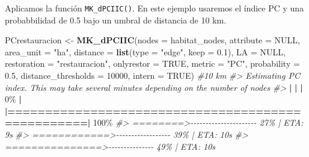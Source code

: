 \documentclass[
]{book}
\newenvironment{Shaded}{\begin{snugshade}}{\end{snugshade}}
\newcommand{\AttributeTok}[1]{\textcolor[rgb]{0.13,0.29,0.53}{#1}}
\newcommand{\CommentTok}[1]{\textcolor[rgb]{0.56,0.35,0.01}{\textit{#1}}}
\newcommand{\ConstantTok}[1]{\textcolor[rgb]{0.56,0.35,0.01}{#1}}
\newcommand{\DecValTok}[1]{\textcolor[rgb]{0.00,0.00,0.81}{#1}}
\newcommand{\ErrorTok}[1]{\textcolor[rgb]{0.64,0.00,0.00}{\textbf{#1}}}
\newcommand{\FloatTok}[1]{\textcolor[rgb]{0.00,0.00,0.81}{#1}}
\newcommand{\FunctionTok}[1]{\textcolor[rgb]{0.13,0.29,0.53}{\textbf{#1}}}
\newcommand{\NormalTok}[1]{#1}
\newcommand{\OtherTok}[1]{\textcolor[rgb]{0.56,0.35,0.01}{#1}}
\newcommand{\SpecialCharTok}[1]{\textcolor[rgb]{0.81,0.36,0.00}{\textbf{#1}}}
\newcommand{\StringTok}[1]{\textcolor[rgb]{0.31,0.60,0.02}{#1}}
\begin{document}
\begin{Shaded}
\end{Shaded}

Aplicamos la función \texttt{MK\_dPCIIC()}. En este ejemplo usaremos el índice PC y una probabbilidad de 0.5 bajo un umbral de distancia de 10 km.

\begin{Shaded}
\begin{Highlighting}[]
\NormalTok{PCrestauracion }\OtherTok{\textless{}{-}} \FunctionTok{MK\_dPCIIC}\NormalTok{(}\AttributeTok{nodes =}\NormalTok{ habitat\_nodes,}
                \AttributeTok{attribute =} \ConstantTok{NULL}\NormalTok{,}
                \AttributeTok{area\_unit =} \StringTok{"ha"}\NormalTok{,}
                \AttributeTok{distance =} \FunctionTok{list}\NormalTok{(}\AttributeTok{type =} \StringTok{"edge"}\NormalTok{, }\AttributeTok{keep =} \FloatTok{0.1}\NormalTok{),}
                \AttributeTok{LA =} \ConstantTok{NULL}\NormalTok{,}
                \AttributeTok{restoration =} \StringTok{"restauracion"}\NormalTok{,}
                \AttributeTok{onlyrestor =} \ConstantTok{TRUE}\NormalTok{,}
                \AttributeTok{metric =} \StringTok{"PC"}\NormalTok{,}
                \AttributeTok{probability =} \FloatTok{0.5}\NormalTok{,}
                \AttributeTok{distance\_thresholds =} \DecValTok{10000}\NormalTok{,}
                \AttributeTok{intern =} \ConstantTok{TRUE}\NormalTok{) }\CommentTok{\#10 km}
\CommentTok{\#\textgreater{} Estimating PC index. This may take several minutes depending on the number of nodes}
\CommentTok{\#\textgreater{} }
  \SpecialCharTok{|}                                                        
  \ErrorTok{|}                                                  \ErrorTok{|}   \DecValTok{0}\NormalTok{\%}
  \SpecialCharTok{|}                                                        
  \ErrorTok{|==================================================|} \DecValTok{100}\NormalTok{\%}
\CommentTok{\#\textgreater{}  ========\textgreater{}{-}{-}{-}{-}{-}{-}{-}{-}{-}{-}{-}{-}{-}{-}{-}{-}{-}{-}{-}{-}{-}{-}   27\% |  ETA:  9s}
\CommentTok{\#\textgreater{}  ============\textgreater{}{-}{-}{-}{-}{-}{-}{-}{-}{-}{-}{-}{-}{-}{-}{-}{-}{-}{-}   39\% |  ETA: 10s}
\CommentTok{\#\textgreater{}  ===============\textgreater{}{-}{-}{-}{-}{-}{-}{-}{-}{-}{-}{-}{-}{-}{-}{-}   49\% |  ETA: 10s}

\end{Highlighting}
\end{Shaded}
\end{document}
